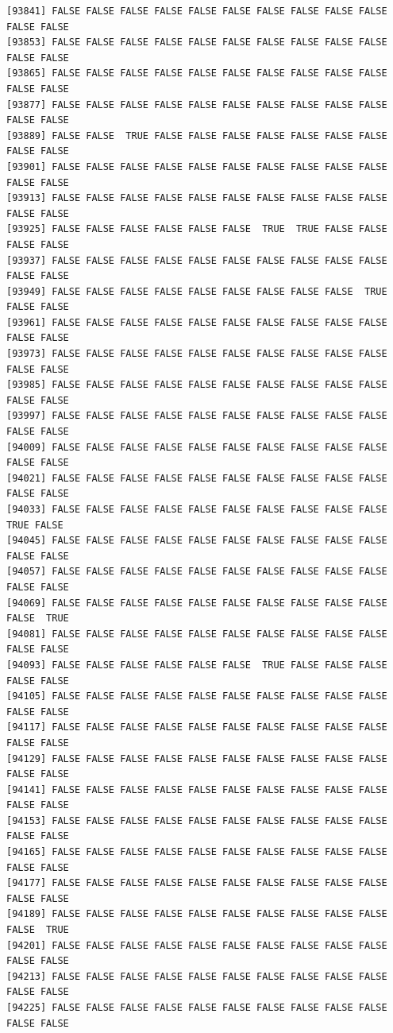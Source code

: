 \documentclass[
  a4paper,
  DIV=11,
  numbers=noendperiod]{scrartcl}
\begin{document}
\begin{verbatim}
[93841] FALSE FALSE FALSE FALSE FALSE FALSE FALSE FALSE FALSE FALSE FALSE FALSE
[93853] FALSE FALSE FALSE FALSE FALSE FALSE FALSE FALSE FALSE FALSE FALSE FALSE
[93865] FALSE FALSE FALSE FALSE FALSE FALSE FALSE FALSE FALSE FALSE FALSE FALSE
[93877] FALSE FALSE FALSE FALSE FALSE FALSE FALSE FALSE FALSE FALSE FALSE FALSE
[93889] FALSE FALSE  TRUE FALSE FALSE FALSE FALSE FALSE FALSE FALSE FALSE FALSE
[93901] FALSE FALSE FALSE FALSE FALSE FALSE FALSE FALSE FALSE FALSE FALSE FALSE
[93913] FALSE FALSE FALSE FALSE FALSE FALSE FALSE FALSE FALSE FALSE FALSE FALSE
[93925] FALSE FALSE FALSE FALSE FALSE FALSE  TRUE  TRUE FALSE FALSE FALSE FALSE
[93937] FALSE FALSE FALSE FALSE FALSE FALSE FALSE FALSE FALSE FALSE FALSE FALSE
[93949] FALSE FALSE FALSE FALSE FALSE FALSE FALSE FALSE FALSE  TRUE FALSE FALSE
[93961] FALSE FALSE FALSE FALSE FALSE FALSE FALSE FALSE FALSE FALSE FALSE FALSE
[93973] FALSE FALSE FALSE FALSE FALSE FALSE FALSE FALSE FALSE FALSE FALSE FALSE
[93985] FALSE FALSE FALSE FALSE FALSE FALSE FALSE FALSE FALSE FALSE FALSE FALSE
[93997] FALSE FALSE FALSE FALSE FALSE FALSE FALSE FALSE FALSE FALSE FALSE FALSE
[94009] FALSE FALSE FALSE FALSE FALSE FALSE FALSE FALSE FALSE FALSE FALSE FALSE
[94021] FALSE FALSE FALSE FALSE FALSE FALSE FALSE FALSE FALSE FALSE FALSE FALSE
[94033] FALSE FALSE FALSE FALSE FALSE FALSE FALSE FALSE FALSE FALSE  TRUE FALSE
[94045] FALSE FALSE FALSE FALSE FALSE FALSE FALSE FALSE FALSE FALSE FALSE FALSE
[94057] FALSE FALSE FALSE FALSE FALSE FALSE FALSE FALSE FALSE FALSE FALSE FALSE
[94069] FALSE FALSE FALSE FALSE FALSE FALSE FALSE FALSE FALSE FALSE FALSE  TRUE
[94081] FALSE FALSE FALSE FALSE FALSE FALSE FALSE FALSE FALSE FALSE FALSE FALSE
[94093] FALSE FALSE FALSE FALSE FALSE FALSE  TRUE FALSE FALSE FALSE FALSE FALSE
[94105] FALSE FALSE FALSE FALSE FALSE FALSE FALSE FALSE FALSE FALSE FALSE FALSE
[94117] FALSE FALSE FALSE FALSE FALSE FALSE FALSE FALSE FALSE FALSE FALSE FALSE
[94129] FALSE FALSE FALSE FALSE FALSE FALSE FALSE FALSE FALSE FALSE FALSE FALSE
[94141] FALSE FALSE FALSE FALSE FALSE FALSE FALSE FALSE FALSE FALSE FALSE FALSE
[94153] FALSE FALSE FALSE FALSE FALSE FALSE FALSE FALSE FALSE FALSE FALSE FALSE
[94165] FALSE FALSE FALSE FALSE FALSE FALSE FALSE FALSE FALSE FALSE FALSE FALSE
[94177] FALSE FALSE FALSE FALSE FALSE FALSE FALSE FALSE FALSE FALSE FALSE FALSE
[94189] FALSE FALSE FALSE FALSE FALSE FALSE FALSE FALSE FALSE FALSE FALSE  TRUE
[94201] FALSE FALSE FALSE FALSE FALSE FALSE FALSE FALSE FALSE FALSE FALSE FALSE
[94213] FALSE FALSE FALSE FALSE FALSE FALSE FALSE FALSE FALSE FALSE FALSE FALSE
[94225] FALSE FALSE FALSE FALSE FALSE FALSE FALSE FALSE FALSE FALSE FALSE FALSE

\end{verbatim}
\end{document}
